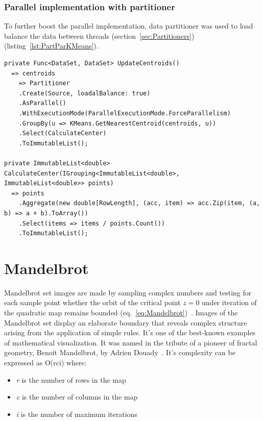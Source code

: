 \subsubsection{Parallel implementation with partitioner}
To further boost the parallel implementation, data partitioner was used to load balance the data between threads (section~\ref{sec:Partitioners}) (listing~\ref{lst:PartParKMeans}). 

\begin{lstlisting}[style=sharpcstyle, caption={Parallel \texttt{k-means} algorithm with partitioner}, label={lst:PartParKMeans},
numbers=none, xleftmargin=0pt,framexleftmargin=0pt,framexrightmargin=0pt,framexbottommargin=0pt]
private Func<DataSet, DataSet> UpdateCentroids()
  => centroids 
    => Partitioner
    .Create(Source, loadalBalance: true)
    .AsParallel()
    .WithExecutionMode(ParallelExecutionMode.ForceParallelism)
    .GroupBy(u => KMeans.GetNearestCentroid(centroids, u))
    .Select(CalculateCenter)
    .ToImmutableList();

private ImmutableList<double> CalculateCenter(IGrouping<ImmutableList<double>, ImmutableList<double>> points) 
  => points
    .Aggregate(new double[RowLength], (acc, item) => acc.Zip(item, (a, b) => a + b).ToArray())
    .Select(items => items / points.Count())
    .ToImmutableList();
\end{lstlisting}

\clearpage
\section{Mandelbrot}
\label{sec: MandelbrotImp}
Mandelbrot set images are made by sampling complex numbers and testing for each sample point whether the orbit of the critical point $z = 0$ under iteration of the quadratic map remains bounded (eq.~\ref{eq:Mandelbrot})~\cite{MandelbrotExplorer}. Images of the Mandelbrot set display an elaborate boundary that reveals complex structure arising from the application of simple rules. It's one of the best-known examples of mathematical visualization. It was named in the tribute of a pioneer of fractal geometry, Benoit Mandelbrot, by Adrien Douady~\cite{Douady}.
It's complexity can be expressed as O(rci) where:
\begin{itemize}
	\item \emph{r} is the number of rows in the map
	\item \emph{c} is the number of columns in the map
	\item \emph{i} is the number of maximum iterations
	\end{itemize}

